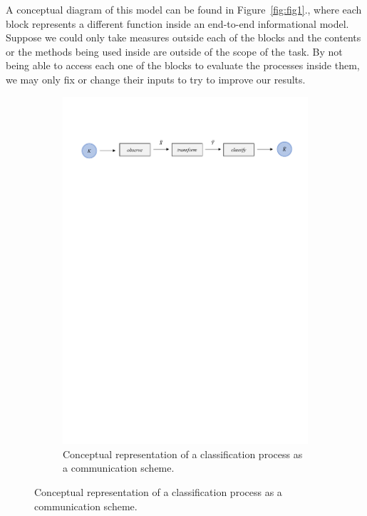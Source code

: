 A conceptual diagram of this model can be found in Figure~\ref{fig:fig1}., where each block represents a different function inside an end-to-end informational model. Suppose we could only take measures outside each of the blocks and the contents or the methods being used inside are outside of the scope of the task. By not being able to access each one of the blocks to evaluate the processes inside them, we may only fix or change their inputs to try to improve our results.
%
\begin{figure}[H]
	\begin{subfigure}{1\textwidth}  
		\centering
		\includegraphics[width=16cm]{Figuras_tfg/Figura1_tfg}
		\caption{Conceptual representation of a classification process as a communication scheme.}
		\label{fig:fig1b} 
	\end{subfigure}%
	

\end{figure}
